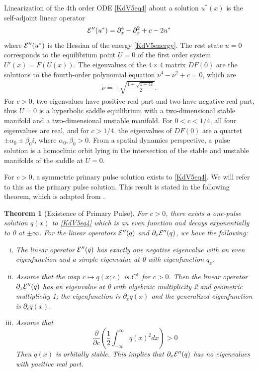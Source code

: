 \documentclass[11pt,reqno]{amsart}
\theoremstyle{plain}
\newtheorem{theorem}{Theorem}
\theoremstyle{definition}
\theoremstyle{remark}
\begin{document}
Linearization of the 4th order ODE \cref{KdV5eq4} about a solution $u^*(x)$ is the self-adjoint linear operator
\begin{equation}\label{KdV5hessian}
\mathcal{E}''(u^*) = \partial_x^4 - \partial_x^2 + c - 2 u^* 
\end{equation}
where $\mathcal{E}''(u^*)$ is the Hessian of the energy \cref{KdV5energy}. The rest state $u = 0$ corresponds to the equilibrium point $U = 0$ of the first order system $U'(x) = F(U(x))$. The eigenvalues of the $4 \times 4$ matrix $DF(0)$ are the solutions to the fourth-order polynomial equation $\nu^4 - \nu^2 + c = 0$, which are
\begin{align}
\nu = \pm \sqrt{ \frac{1 \pm \sqrt{1 - 4c} }{2}}.
\end{align}
For $c > 0$, two eigenvalues have positive real part and two have negative real part, thus $U = 0$ is a hyperbolic saddle equilibrium with a two-dimensional stable manifold and a two-dimensional unstable manifold. For $0 < c < 1/4$, all four eigenvalues are real, and for $c > 1/4$, the eigenvalues of $DF(0)$ are a quartet $\pm \alpha_0 \pm \beta_0 i$, where $\alpha_0, \beta_0 > 0$. From a spatial dynamics perspective, a pulse solution is a homoclinic orbit lying in the intersection of the stable and unstable manifolds of the saddle at $U = 0$.

For $c > 0$, a symmetric primary pulse solution exists to \cref{KdV5eq4}. We will refer to this as the primary pulse solution. This result is stated in the following theorem, which is adapted from \cite[Theorem 2.1]{Pelinovsky2007}.

\begin{theorem}[Existence of Primary Pulse]\label{KdV1pulse}
For $c > 0$, there exists a one-pulse solution $q(x)$ to \cref{KdV5eq4} which is an even function and decays exponentially to 0 at $\pm \infty$. For the linear operators $\mathcal{E}''(q)$ and $\partial_x \mathcal{E}''(q)$, we have the following:
\begin{enumerate}[(i)]
\item The linear operator $\mathcal{E}''(q)$ has exactly one negative eigenvalue with an even eigenfunction and a simple eigenvalue at 0 with eigenfunction $q_x$.
\item Assume that the map $c \mapsto q(x; c)$ is $C^1$ for $c > 0$. Then the linear operator $\partial_x \mathcal{E}''(q)$ has an eigenvalue at 0 with algebraic multiplicity 2 and geometric multiplicity 1; the eigenfunction is $\partial_x q(x)$ and the generalized eigenfunction is $\partial_c q(x)$. 
\item Assume that 
\[
\frac{\partial}{\partial c} \left( \frac{1}{2} \int_{-\infty}^\infty q(x)^2 dx \right) > 0
\]
Then $q(x)$ is orbitally stable. This implies that $\partial_x \mathcal{E}''(q)$ has no eigenvalues with positive real part.
\end{enumerate}
\end{theorem}
\end{document}
